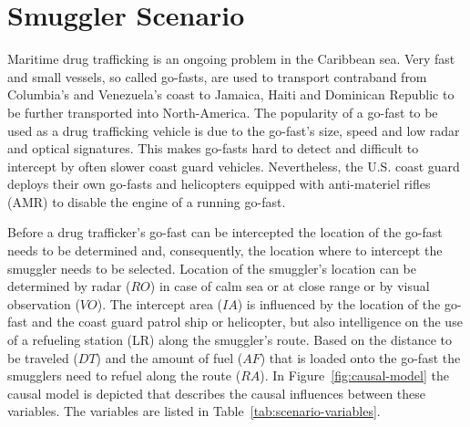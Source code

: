 \documentclass[conference]{IEEEtran}
\begin{document}
\section{Smuggler Scenario}


Maritime drug trafficking is an ongoing problem in the Caribbean sea. Very fast and small vessels, so called go-fasts, are used to transport contraband from Columbia's and Venezuela's coast to Jamaica, Haiti and Dominican Republic to be further transported into North-America. The popularity of a go-fast to be used as a drug trafficking vehicle is due to the go-fast's size, speed and low radar and optical signatures. This makes go-fasts hard to detect and difficult to intercept by often slower coast guard vehicles. Nevertheless, the U.S. coast guard deploys their own go-fasts and helicopters equipped with anti-materiel rifles (AMR) to disable the engine of a running go-fast. 

Before a drug trafficker's go-fast can be intercepted the location of the go-fast needs to be determined and, consequently, the location where to intercept the smuggler needs to be selected. Location of the smuggler's location can be determined by radar ($RO$) in case of calm sea or at close range or by visual observation ($VO$). The intercept area ($IA$) is influenced by the location of the go-fast and the coast guard patrol ship or helicopter, but also intelligence on the use of a refueling station (LR) along the smuggler's route. Based on the distance to be traveled ($DT$) and the amount of fuel ($AF$) that is loaded onto the go-fast the smugglers need to refuel along the route ($RA$). In Figure~\ref{fig:causal-model} the causal model is depicted that describes the causal influences between these variables. The variables are listed in Table~\ref{tab:scenario-variables}.
\end{document}
